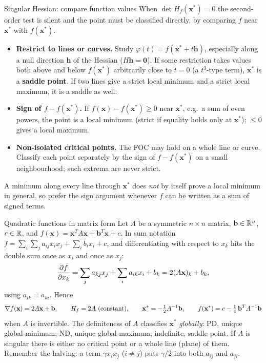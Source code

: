 \begin{rulebox}{Singular Hessian: compare function values}
When $\det H_f(\mathbf{x}^*)=0$ the second-order test is silent and the
point must be classified directly, by comparing $f$ near $\mathbf{x}^*$
with $f(\mathbf{x}^*)$.
\begin{itemize}[leftmargin=1.6em,itemsep=0.3ex]
  \item \textbf{Restrict to lines or curves.} Study
        $\varphi(t)=f(\mathbf{x}^*+t\mathbf{h})$, especially along a null
        direction $\mathbf{h}$ of the Hessian ($H\mathbf{h}=\mathbf{0}$).
        If some restriction takes values both above and below
        $f(\mathbf{x}^*)$ arbitrarily close to $t=0$ (a $t^{3}$-type term),
        $\mathbf{x}^*$ is a \textbf{saddle point}. If two lines give a
        strict local minimum and a strict local maximum, it is a saddle as
        well.
  \item \textbf{Sign of $f-f(\mathbf{x}^*)$.} If
        $f(\mathbf{x})-f(\mathbf{x}^*)\ge0$ near $\mathbf{x}^*$, e.g.\ a sum
        of even powers, the point is a local minimum (strict if equality
        holds only at $\mathbf{x}^*$); $\le0$ gives a local maximum.
  \item \textbf{Non-isolated critical points.} The FOC may hold on a whole
        line or curve. Classify each point separately by the sign of
        $f-f(\mathbf{x}^*)$ on a small neighbourhood; such extrema are never
        strict.
\end{itemize}
A minimum along every line through $\mathbf{x}^*$ does \emph{not} by itself
prove a local minimum in general, so prefer the sign argument whenever $f$
can be written as a sum of signed terms.
\end{rulebox}

\begin{rulebox}{Quadratic functions in matrix form}
Let $A$ be a symmetric $n\times n$ matrix, $\mathbf{b}\in\mathbb{R}^{n}$, $c\in\mathbb{R}$,
and $f(\mathbf{x})=\mathbf{x}^{T}A\mathbf{x}+\mathbf{b}^{T}\mathbf{x}+c$.
In sum notation $f=\sum_{i}\sum_{j}a_{ij}x_ix_j+\sum_ib_ix_i+c$, and
differentiating with respect to $x_k$ hits the double sum once as $x_i$ and
once as $x_j$:
\[
  \frac{\partial f}{\partial x_k}=\sum_{j}a_{kj}x_j+\sum_{i}a_{ik}x_i+b_k
  =2(A\mathbf{x})_k+b_k ,
\]
using $a_{ik}=a_{ki}$. Hence
\[
  \nabla f(\mathbf{x})=2A\mathbf{x}+\mathbf{b},\qquad H_f=2A\ \text{(constant)},
  \qquad
  \mathbf{x}^*=-\tfrac12A^{-1}\mathbf{b},\qquad
  f(\mathbf{x}^*)=c-\tfrac14\,\mathbf{b}^{T}A^{-1}\mathbf{b}
\]
when $A$ is invertible. The definiteness of $A$ classifies $\mathbf{x}^*$
\emph{globally}: PD, unique global minimum; ND, unique global maximum;
indefinite, saddle point. If $A$ is singular there is either no critical
point or a whole line (plane) of them. Remember the halving: a term
$\gamma x_ix_j$ ($i\neq j$) puts $\gamma/2$ into both $a_{ij}$ and $a_{ji}$.
\end{rulebox}

